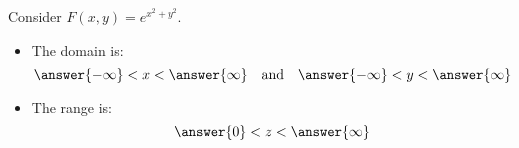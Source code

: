 \documentclass{ximera}
\author{Jim Talamo \and Bart Snapp}
\begin{document}
\begin{exercise}
  Consider $F(x,y) = e^{x^2+y^2}$.
  \begin{itemize}
  \item The domain is:
    \[
    \answer{-\infty} < x < \answer{\infty}\quad\text{and}\quad \answer{-\infty} < y < \answer{\infty}
    \]
  \item The range is:
    \[
     \answer{0} < z < \answer{\infty}
    \]    
  \end{itemize}
\end{exercise}
\end{document}

